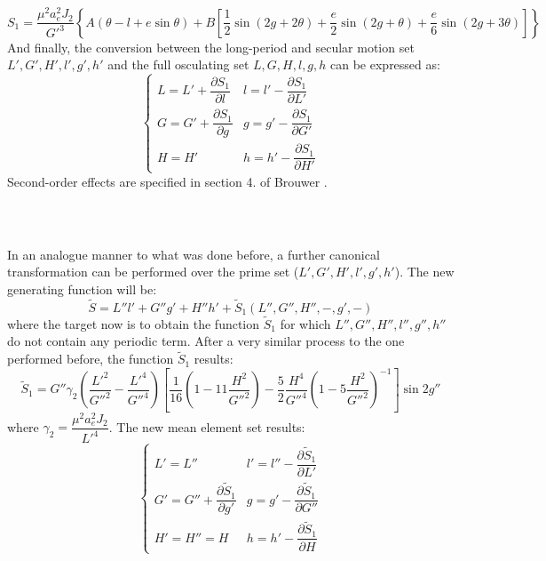 		\begin{equation}
		S_1 = \dfrac{\mu^2 a_e^2 J_2}{G'^3} \left\{ A \left(\theta - l + e\sin \theta\right) + B\left[\dfrac{1}{2}\sin(2g + 2\theta) + \dfrac{e}{2} \sin(2g + \theta) + \dfrac{e}{6} \sin(2g + 3\theta)\right]\right\}
		\end{equation}
		\indent And finally, the conversion between the long-period and secular motion set $L', G', H', l', g', h'$ and the full osculating set $L, G, H, l, g, h$ can be expressed as:
		\begin{equation}
		\left\{
		\begin{array}{cc}
		L = L' + \dfrac{\partial S_1}{\partial l} 	& l = l' - \dfrac{\partial S_1}{\partial L'}\\[1.2em]
		G = G' + \dfrac{\partial S_1}{\partial g} 	& g = g' - \dfrac{\partial S_1}{\partial G'}\\[1.2em]
		H = H' 										& h = h' - \dfrac{\partial S_1}{\partial H'}
		\end{array}\right.
		\label{eqCh4:rid_SP}
		\end{equation}
		\indent Second-order effects are specified in section 4. of Brouwer \cite{Brouwer}. 
		\subparagraph{  \\}
		\indent In an analogue manner to what was done before, a further canonical transformation can be performed over the prime set ($L', G', H', l', g', h'$). The new generating function will be:
		\[
		\tilde{S} = L'' l' + G'' g' + H'' h' + \tilde{S}_1 (L'', G'', H'', -, g', -)
		\]
		\noindent where the target now is to obtain the function $\tilde{S}_1$ for which $L'', G'', H'', l'', g'', h''$ do not contain any periodic term. After a very similar process to the one performed before, the function $\tilde{S}_1$ results:
		\begin{equation}
		\tilde{S}_1 = G'' \gamma_2 \left(\dfrac{L'^2}{G''^2} - \dfrac{L'^4}{G''^4}\right) \left[ \dfrac{1}{16} \left(1 - 11 \dfrac{H^2}{G''^2}\right) - \dfrac{5}{2} \dfrac{H^4}{G''^4} \left(1 - 5 \dfrac{H^2}{G''^2}\right)^{-1} \right] \sin 2g''
		\end{equation}
		\noindent where $\gamma_2 = \dfrac{\mu^2 a_e^2 J_2}{L'^4}$. The new mean element set results:
		\begin{equation}
		\left\{
		\begin{array}{cc}
		L' = L''												& l' = l'' - \dfrac{\partial \tilde{S}_1}{\partial L'}\\[1.2em]
		G' = G'' + \dfrac{\partial \tilde{S}_1}{\partial g'} 	& g = g' - \dfrac{\partial \tilde{S}_1}{\partial G''}\\[1.2em]
		H' = H'' = H 											& h = h' - \dfrac{\partial \tilde{S}_1}{\partial H}
		\end{array}
		\right.
		\label{eqCh4:rid_LP}
		\end{equation}
